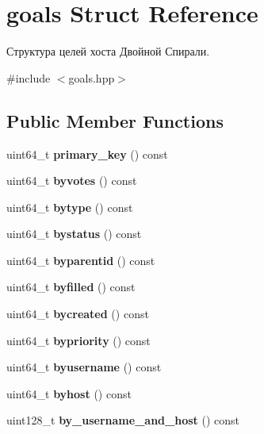 \hypertarget{structgoals}{}\section{goals Struct Reference}
\label{structgoals}


Структура целей хоста Двойной Спирали.  




{\ttfamily \#include $<$goals.\+hpp$>$}

\subsection*{Public Member Functions}
\begin{DoxyCompactItemize}
\item 
\mbox{\label{structgoals_a0f596c490585385d6c3b97bb7f836e88}} 
uint64\+\_\+t {\bfseries primary\+\_\+key} () const
\item 
\mbox{\label{structgoals_a35bab0d724d1a6c708132c66523a4c4b}} 
uint64\+\_\+t {\bfseries byvotes} () const
\item 
\mbox{\label{structgoals_ad49889434ae2b7d6b90a128de3dc3a9f}} 
uint64\+\_\+t {\bfseries bytype} () const
\item 
\mbox{\label{structgoals_a7d12f5bc6b9ec3585aedc6f88027cc25}} 
uint64\+\_\+t {\bfseries bystatus} () const
\item 
\mbox{\label{structgoals_a9a29a715bd4420ff1ac6fdbb2c87fc1b}} 
uint64\+\_\+t {\bfseries byparentid} () const
\item 
\mbox{\label{structgoals_af7c5070af0c06aec15bd030c4a3c9ea9}} 
uint64\+\_\+t {\bfseries byfilled} () const
\item 
\mbox{\label{structgoals_a47f474aedab8dfa47c728067b49e07d1}} 
uint64\+\_\+t {\bfseries bycreated} () const
\item 
\mbox{\label{structgoals_a81da6a1176d4c433a7948db72954a0fa}} 
uint64\+\_\+t {\bfseries bypriority} () const
\item 
\mbox{\label{structgoals_ae9639cc0f759eb74705f68947f773107}} 
uint64\+\_\+t {\bfseries byusername} () const
\item 
\mbox{\label{structgoals_a523680b1ce247d7a24187f0fcac9962d}} 
uint64\+\_\+t {\bfseries byhost} () const
\item 
\mbox{\label{structgoals_ac35b433e7b0d7bed8f2041a093b4d0d4}} 
uint128\+\_\+t {\bfseries by\+\_\+username\+\_\+and\+\_\+host} () const
\end{DoxyCompactItemize}
